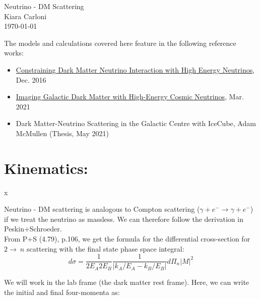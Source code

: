 \documentclass[11pt, oneside]{article}   	%
\begin{document}

{\Large Neutrino - DM Scattering} \\
Kiara Carloni \\
\today

The models and calculations covered here feature in the following reference works:
\begin{itemize}
\item \href{https://arxiv.org/pdf/1612.08472.pdf}{Constraining Dark Matter Neutrino Interaction with High Energy Neutrinos}, Dec. 2016
\item \href{https://arxiv.org/pdf/1703.00451.pdf}{Imaging Galactic Dark Matter with High-Energy Cosmic Neutrinos}, Mar. 2021
\item Dark Matter-Neutrino Scattering in the Galactic Centre with IceCube, Adam McMullen (Thesis, May 2021)
\end{itemize} 


\newpage
\section{\large Kinematics: }x

Neutrino - DM scattering is analogous to Compton scattering ($\gamma + e^- \to \gamma + e^-$) if we treat the neutrino as massless.
We can therefore follow the derivation in Peskin+Schroeder. \\

From P+S (4.79), p.106, we get the formula for the differential cross-section for $2 \to\ n$ scattering with the final state phase space integral: 
\[ d\sigma = \frac{1}{2E_A 2E_B} \frac{1}{\left| k_A / E_A - k_B / E_B \right| } d\Pi_n \left|M\right|^2 \]

We will work in the lab frame (the dark matter rest frame). Here, we can write the initial and final four-momenta as: 
\end{document}
